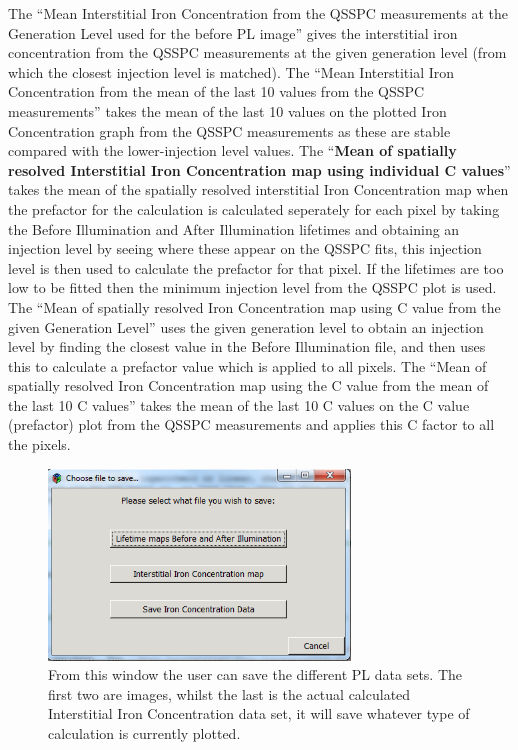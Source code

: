 \documentclass[final,a4paper,oneside,12pt]{article}
\begin{document}
The ``Mean Interstitial Iron Concentration from the QSSPC measurements at the Generation Level used for the before PL image'' gives the interstitial iron concentration from the QSSPC measurements at the given generation level (from which the closest injection level is matched). The ``Mean Interstitial Iron Concentration from the mean of the last 10 values from the QSSPC measurements'' takes the mean of the last 10 values on the plotted Iron Concentration graph from the QSSPC measurements as these are stable compared with the lower-injection level values. The ``{\bf Mean of spatially resolved Interstitial Iron Concentration map using individual C values}'' takes the mean of the spatially resolved interstitial Iron Concentration map when the prefactor for the calculation is calculated seperately for each pixel by taking the Before Illumination and After Illumination lifetimes and obtaining an injection level by seeing where these appear on the QSSPC fits, this injection level is then used to calculate the prefactor for that pixel. If the lifetimes are too low to be fitted then the minimum injection level from the QSSPC plot is used. The ``Mean of spatially resolved Iron Concentration map using C value from the given Generation Level'' uses the given generation level to obtain an injection level by finding the closest value in the Before Illumination file, and then uses this to calculate a prefactor value which is applied to all pixels. The ``Mean of spatially resolved Iron Concentration map using the C value from the mean of the last 10 C values'' takes the mean of the last 10 C values on the C value (prefactor) plot from the QSSPC measurements and applies this C factor to all the pixels.


\begin{figure}[h!]
\includegraphics[height=2in]{2whichsave}
\caption{\label{figure2} From this window the user can save the different PL data sets. The first two are images, whilst the last is the actual calculated Interstitial Iron Concentration data set, it will save whatever type of calculation is currently plotted.}
\end{figure}
\end{document}
